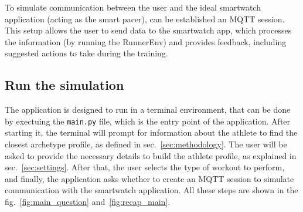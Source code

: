 To simulate communication between the user and the ideal smartwatch application (acting as the smart pacer), can be established an MQTT session. This setup allows the user to send data to the smartwatch app, which processes the information (by running the RunnerEnv) and provides feedback, including suggested actions to take during the training.

\subsection{Run the simulation}\label{subsec:start-application}
The application is designed to run in a terminal environment, that can be done by exectuing the \texttt{main.py} file, which is the entry point of the application.
After starting it, the terminal will prompt for information about the athlete to find the closest archetype profile, as defined in sec.~\ref{sec:methodology}. The user will be asked to provide the necessary details to build the athlete profile, as explained in sec.~\ref{sec:settings}. 
After that, the user selects the type of workout to perform, and finally, the application asks whether to create an MQTT session to simulate communication with the smartwatch application. 
All these steps are shown in the fig.~\ref{fig:main_question} and~\ref{fig:recap_main}.

